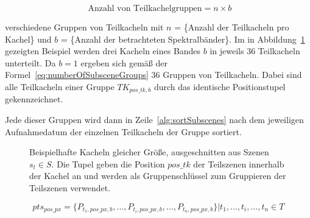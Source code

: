 \begin{equation} \label{eq:numberOfSubsceneGroups}
\text{ Anzahl von Teilkachelgruppen} = n \times b
\end{equation}

 verschiedene Gruppen von Teilkacheln mit $n$ = \{Anzahl der Teilkacheln pro Kachel\} und $b$ = \{Anzahl der betrachteten Spektralbänder\}. Im in Abbildung~\ref{fig:dataCubeSliced} gezeigten Beispiel werden drei Kacheln eines Bandes $b$ in jeweils 36 Teilkacheln unterteilt. Da $b=1$ ergeben sich gemäß der Formel~\ref{eq:numberOfSubsceneGroups} 36 Gruppen von Teilkacheln. Dabei sind alle Teilkacheln einer Gruppe $TK_{pos\_tk, b}$ durch das identische Positionstupel gekennzeichnet.

Jede dieser Gruppen wird dann in Zeile~\ref{alg:sortSubscenes} nach dem jeweiligen Aufnahmedatum der einzelnen Teilkacheln der Gruppe sortiert. 

\begin{figure}[H]
\centering

\caption{Beispielhafte Kacheln gleicher Größe, ausgeschnitten aus Szenen $s_t \in S$. Die Tupel geben die Position $pos\_tk$ der Teilszenen innerhalb der Kachel an und werden als Gruppenschlüssel zum Gruppieren der Teilszenen verwendet.} 
\label{fig:dataCubeSliced}
\end{figure}

\begin{equation} \label{eq:pixelTimeSeries}
pts_{pos\_px} = \{P_{t_1, pos\_px, b}, ..., P_{t_i, pos\_px, b}, ... , P_{t_n, pos\_px, b}\} | t_1, ..., t_i, ..., t_n \in T
\end{equation}

